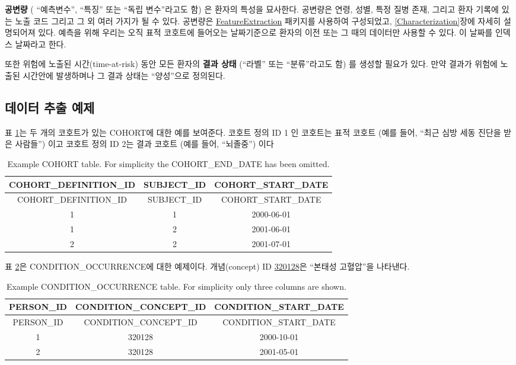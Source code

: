 \documentclass[11pt]{book}
\theoremstyle{definition}
\theoremstyle{definition}
\theoremstyle{definition}
\theoremstyle{remark}
\begin{document}
\textbf{공변량} ( ``예측변수'', ``특징'' 또는 ``독립 변수''라고도 함) 은
환자의 특성을 묘사한다. 공변량은 연령, 성별, 특정 질병 존재, 그리고 환자
기록에 있는 노출 코드 그리고 그 외 여러 가지가 될 수 있다. 공변량은
\href{https://ohdsi.github.io/FeatureExtraction/}{FeatureExtraction}
패키지를 사용하여 구성되었고, \ref{Characterization}장에 자세히
설명되어져 있다. 예측을 위해 우리는 오직 표적 코호트에 들어오는
날짜기준으로 환자의 이전 또는 그 때의 데이터만 사용할 수 있다. 이 날짜를
인덱스 날짜라고 한다.

또한 위험에 노출된 시간(time-at-risk) 동안 모든 환자의 \textbf{결과
상태} (``라벨'' 또는 ``분류''라고도 함) 를 생성할 필요가 있다. 만약
결과가 위험에 노출된 시간안에 발생하며나 그 결과 상태는 ``양성''으로
정의된다.  

\subsection{데이터 추출 예제}\label{--}

표 \ref{tab:plpExampleCohorts}는 두 개의 코호트가 있는 COHORT에 대한
예를 보여준다. 코호트 정의 ID 1 인 코호트는 표적 코호트 (예를 들어,
``최근 심방 세동 진단을 받은 사람들'') 이고 코호트 정의 ID 2는 결과
코호트 (예를 들어, ``뇌졸중'') 이다

\begin{longtable}[]{@{}ccc@{}}
\caption{\label{tab:plpExampleCohorts} Example COHORT table. For simplicity
the COHORT\_END\_DATE has been omitted.}\tabularnewline
\toprule
COHORT\_DEFINITION\_ID & SUBJECT\_ID &
COHORT\_START\_DATE\tabularnewline
\midrule
\endfirsthead
\toprule
COHORT\_DEFINITION\_ID & SUBJECT\_ID &
COHORT\_START\_DATE\tabularnewline
\midrule
\endhead
1 & 1 & 2000-06-01\tabularnewline
1 & 2 & 2001-06-01\tabularnewline
2 & 2 & 2001-07-01\tabularnewline
\bottomrule
\end{longtable}

표 \ref{tab:plpExampleConditions}은 CONDITION\_OCCURRENCE에 대한
예제이다. 개념(concept) ID
\href{http://athena.ohdsi.org/search-terms/terms/320128}{320128}은
``본태성 고혈압''을 나타낸다.

\begin{longtable}[]{@{}ccc@{}}
\caption{\label{tab:plpExampleConditions} Example CONDITION\_OCCURRENCE
table. For simplicity only three columns are shown.}\tabularnewline
\toprule
PERSON\_ID & CONDITION\_CONCEPT\_ID &
CONDITION\_START\_DATE\tabularnewline
\midrule
\endfirsthead
\toprule
PERSON\_ID & CONDITION\_CONCEPT\_ID &
CONDITION\_START\_DATE\tabularnewline
\midrule
\endhead
1 & 320128 & 2000-10-01\tabularnewline
2 & 320128 & 2001-05-01\tabularnewline
\bottomrule
\end{longtable}
\end{document}
